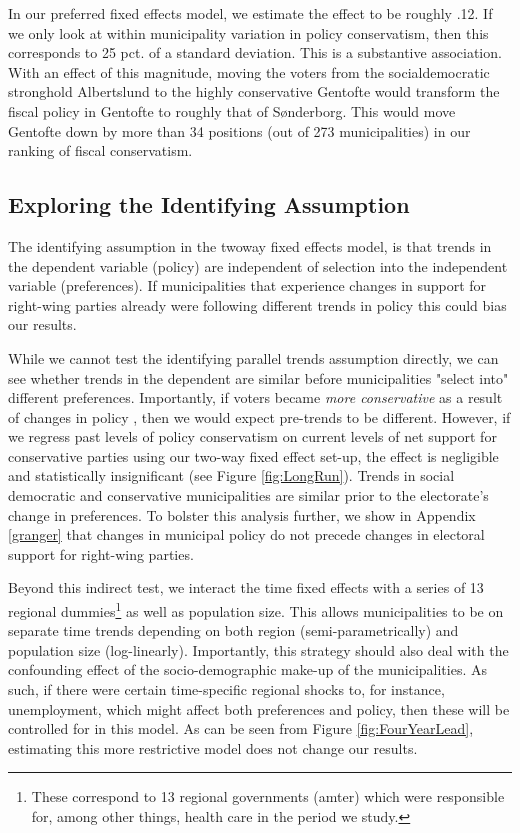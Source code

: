 \documentclass[a4paper,12pt]{article}
\begin{document}
In our preferred fixed effects model, we estimate the effect to be roughly .12. If we only look at within municipality variation in policy conservatism, then this corresponds to 25 pct. of a standard deviation.  This is a substantive association. With an effect of this magnitude, moving the voters from the socialdemocratic stronghold Albertslund to the highly conservative Gentofte would transform the fiscal policy in Gentofte to roughly that of Sønderborg. This would move Gentofte down by more than 34 positions (out of 273 municipalities) in our ranking of fiscal conservatism.


\subsection*{Exploring the Identifying Assumption}
The identifying assumption in the twoway fixed effects model, is that trends in the dependent variable (policy) are independent of selection into the independent variable (preferences). If municipalities that experience changes in support for right-wing parties already were following different trends in policy this could bias our results. 

While we cannot test the identifying parallel trends assumption directly, we can see whether trends in the dependent are similar before municipalities "select into" different preferences. Importantly, if voters became \emph{more conservative} as a result of changes in policy \cite[cf.][]{lenz2013follow,slothuus2010can}, then we would expect pre-trends to be different. However, if we regress past levels of policy conservatism on current levels of net support for conservative parties using our two-way fixed effect set-up, the effect is negligible and statistically insignificant (see Figure \ref{fig:LongRun}). Trends in social democratic and conservative municipalities are similar prior to the electorate's change in preferences. To  bolster this analysis further,  we show in Appendix \ref{granger} that changes in municipal policy do not precede changes in electoral support for right-wing parties.

Beyond this indirect test,  we interact the time fixed effects with a series of 13 regional dummies\footnote{These correspond to  13 regional governments (amter) which were responsible for, among other things, health care in the period we study.} as well as population size. This allows municipalities to be on separate time trends depending on both region (semi-parametrically) and population size (log-linearly). Importantly, this strategy should also deal with the confounding effect of the socio-demographic make-up of the municipalities. As such, if there were certain time-specific regional shocks to, for instance, unemployment, which might affect both preferences and policy, then these will be controlled for in this model. As can be seen from Figure \ref{fig:FourYearLead}, estimating this more restrictive model does not change our results.
\end{document}
